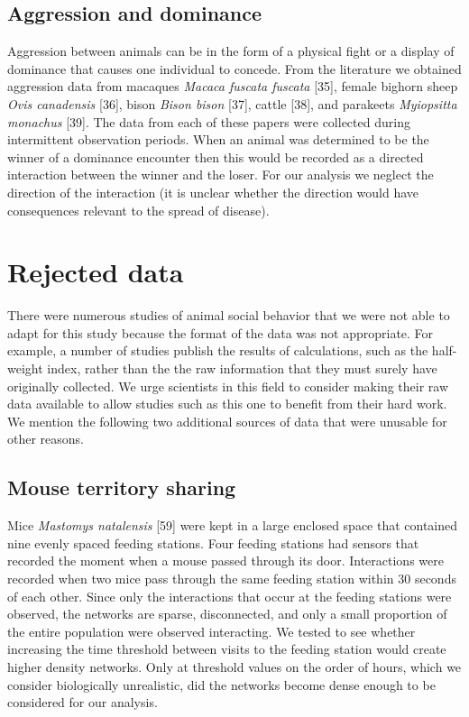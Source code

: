 \documentclass[twocolumn,8pt]{article}
\begin{document}
\subsection{Aggression and dominance}
Aggression between animals can be in the form of a physical fight or a display of dominance that causes one individual to concede. From the literature we obtained aggression data from macaques \emph{Macaca fuscata fuscata} [35], female bighorn sheep \emph{Ovis canadensis} [36], bison \emph{Bison bison} [37], cattle [38], and parakeets \emph{Myiopsitta monachus} [39]. The data from each of these papers were collected during intermittent observation periods. When an animal was determined to be the winner of a dominance encounter then this would be recorded as a directed interaction between the winner and the loser. For our analysis we neglect the direction of the interaction (it is unclear whether the direction would have consequences relevant to the spread of disease).

\section{Rejected data}
There were numerous studies of animal social behavior that we were not able to adapt for this study because the format of the data was not appropriate. For example, a number of studies publish the results of calculations, such as the half-weight index, rather than the the raw information that they must surely have originally collected. We urge scientists in this field to consider making their raw data available to allow studies such as this one to benefit from their hard work. We mention the following two additional sources of data that were unusable for other reasons.

\subsection{Mouse territory sharing}
Mice \emph{Mastomys natalensis} [59] were kept in a large enclosed space that contained nine evenly spaced feeding stations. Four feeding stations had sensors that recorded the moment when a mouse passed through its door. Interactions were recorded when two mice pass through the same feeding station within $30$ seconds of each other. Since only the interactions that occur at the feeding stations were observed, the networks are sparse, disconnected, and only a small proportion of the entire population were observed interacting. We tested to see whether increasing the time threshold between visits to the feeding station would create higher density networks. Only at threshold values on the order of hours, which we consider biologically unrealistic, did the networks become dense enough to be considered for our analysis.
\end{document}
